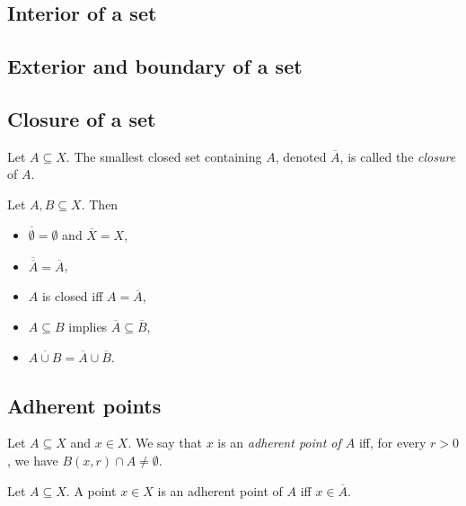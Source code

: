 \documentclass{article}
\begin{document}
\subsection{Interior of a set}

\subsection{Exterior and boundary of a set}

\subsection{Closure of a set}

\begin{definition}
    Let $A\subseteq X$. The smallest closed set containing $A$, denoted $\overline A$, is called
    the \emph{closure} of $A$.
\end{definition}

\begin{proposition}[Notes 4.26]
    Let $A,B\subseteq X$. Then
    \begin{itemize}
        \item $\overline\emptyset = \emptyset$ and $\overline X = X$,
        \item $\overline{\overline A} = \overline A$,
        \item $A$ is closed iff $A=\overline A$,
        \item $A\subseteq B$ implies $\overline A\subseteq\overline B$,
        \item $\overline{A\cup B} = \overline A \cup \overline B$.
    \end{itemize}
\end{proposition}

\subsection{Adherent points}

\begin{definition}[Notes 4.27]
    Let $A\subseteq X$ and $x\in X$. We say that $x$ is an \emph{adherent point of $A$}
    iff, for every $r>0$, we have $B(x,r)\cap A\not=\emptyset$.
\end{definition}

\begin{proposition}[Notes 4.29]
    Let $A\subseteq X$. A point $x\in X$ is an adherent point of $A$ iff
    $x\in\overline A$.
\end{proposition}
\end{document}
